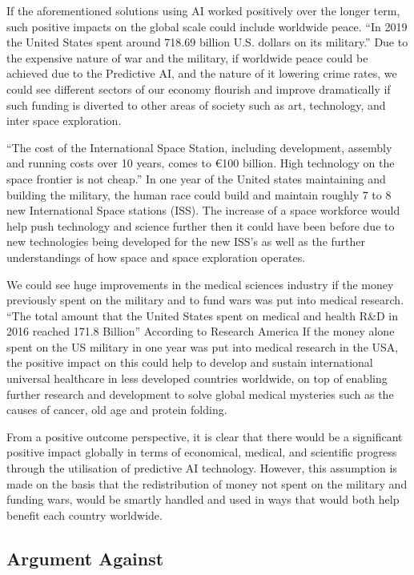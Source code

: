 \documentclass{article}
\begin{document}
If the aforementioned solutions using AI worked positively over the longer term, such positive impacts on the global scale could include worldwide peace. “In 2019 the United States spent around 718.69 billion U.S. dollars on its military.” \cite{duffin_2020} Due to the expensive nature of war and the military, if worldwide peace could be achieved due to the Predictive AI, and the nature of it lowering crime rates, we could see different sectors of our economy flourish and improve dramatically if such funding is diverted to other areas of society such as art, technology, and inter space exploration. 

“The cost of the International Space Station, including development, assembly and running costs over 10 years, comes to €100 billion. High technology on the space frontier is not cheap.” \cite{the-european-space-agency} In one year of the United states maintaining and building the military, the human race could build and maintain roughly 7 to 8 new International Space stations (ISS). The increase of a space workforce would help push technology and science further then it could have been before due to new technologies being developed for the new ISS’s as well as the further understandings of how space and space exploration operates.

We could see huge improvements in the medical sciences industry if the money previously spent on the military and to fund wars was put into medical research. “The total amount that the United States spent on medical and health R&D in 2016 reached 171.8 Billion” According to Research America \cite{research-america_2017} If the money alone spent on the US military in one year was put into medical research in the USA, the positive impact on this could help to develop and sustain international universal healthcare in less developed countries worldwide, on top of enabling further research and development to solve global medical mysteries such as the causes of cancer, old age and protein folding. 

 From a positive outcome perspective, it is clear that there would be a significant positive impact globally in terms of economical, medical, and scientific progress through the utilisation of predictive AI technology.  However, this assumption is made on the basis that the redistribution of money not spent on the military and funding wars, would be smartly handled and used in ways that would both help benefit each country worldwide.

\subsection{Argument Against}
\end{document}
